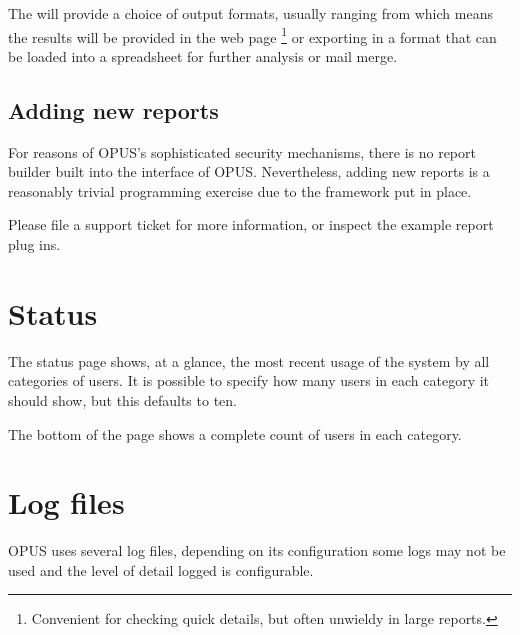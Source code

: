 \documentclass[12 pt]{book}
\begin{document}
The  will provide a choice of output formats, usually
ranging from  which means the results will be 
provided in the web page%
\footnote{Convenient for checking quick details, but often unwieldy in large reports.}
or exporting in a format that can be loaded into a spreadsheet for further
analysis or mail merge.


\subsection{Adding new reports}

For reasons of OPUS's sophisticated security mechanisms, there is no report
builder built into the interface of OPUS. Nevertheless, adding new reports
is a reasonably trivial programming exercise due to the framework put in place.

Please file a support ticket for more information, or inspect the example report
plug ins.

\section{Status}

The status page shows, at a glance, the most recent usage of the system by all categories of
users. It is possible to specify how many users in each category it should show, but this defaults to ten.

The bottom of the page shows a complete count of users in each category.


\section{Log files}

OPUS uses several log files, depending on its configuration some logs may not be used and
the level of detail logged is configurable.
\end{document}
